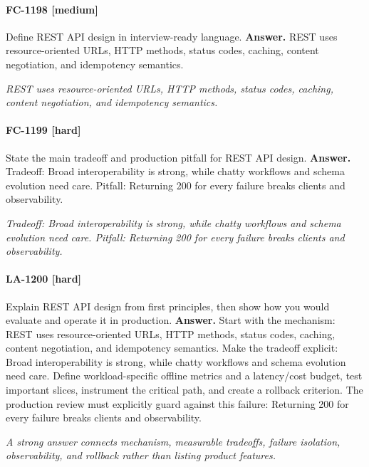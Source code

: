 \paragraph{FC-1198 [medium]} Define REST API design in interview-ready language.
\noindent\textbf{Answer.} REST uses resource-oriented URLs, HTTP methods, status codes, caching, content negotiation, and idempotency semantics.
\par\textit{REST uses resource-oriented URLs, HTTP methods, status codes, caching, content negotiation, and idempotency semantics.}
\paragraph{FC-1199 [hard]} State the main tradeoff and production pitfall for REST API design.
\noindent\textbf{Answer.} Tradeoff: Broad interoperability is strong, while chatty workflows and schema evolution need care. Pitfall: Returning 200 for every failure breaks clients and observability.
\par\textit{Tradeoff: Broad interoperability is strong, while chatty workflows and schema evolution need care. Pitfall: Returning 200 for every failure breaks clients and observability.}
\paragraph{LA-1200 [hard]} Explain REST API design from first principles, then show how you would evaluate and operate it in production.
\noindent\textbf{Answer.} Start with the mechanism: REST uses resource-oriented URLs, HTTP methods, status codes, caching, content negotiation, and idempotency semantics. Make the tradeoff explicit: Broad interoperability is strong, while chatty workflows and schema evolution need care. Define workload-specific offline metrics and a latency/cost budget, test important slices, instrument the critical path, and create a rollback criterion. The production review must explicitly guard against this failure: Returning 200 for every failure breaks clients and observability.
\par\textit{A strong answer connects mechanism, measurable tradeoffs, failure isolation, observability, and rollback rather than listing product features.}
